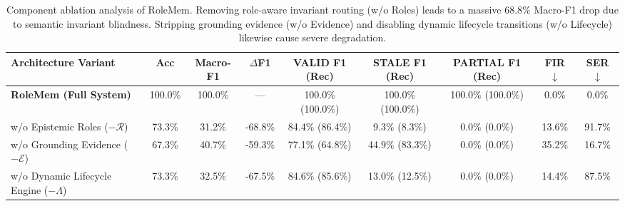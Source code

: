 \begin{table}[t]
\centering
\small
\begin{tabular}{lcccccccc}
\toprule
\textbf{Architecture Variant} & \textbf{Acc} & \textbf{Macro-F1} & $\Delta$\textbf{F1} & \textbf{VALID F1 (Rec)} & \textbf{STALE F1 (Rec)} & \textbf{PARTIAL F1 (Rec)} & \textbf{FIR} $\downarrow$ & \textbf{SER} $\downarrow$ \\
\midrule
\textbf{RoleMem (Full System)} & 100.0\% & 100.0\% & --- & 100.0\% (100.0\%) & 100.0\% (100.0\%) & 100.0\% (100.0\%) & 0.0\% & 0.0\% \\
\quad w/o Epistemic Roles ($-\mathcal{R}$) & 73.3\% & 31.2\% & -68.8\% & 84.4\% (86.4\%) & 9.3\% (8.3\%) & 0.0\% (0.0\%) & 13.6\% & 91.7\% \\
\quad w/o Grounding Evidence ($-\mathcal{E}$) & 67.3\% & 40.7\% & -59.3\% & 77.1\% (64.8\%) & 44.9\% (83.3\%) & 0.0\% (0.0\%) & 35.2\% & 16.7\% \\
\quad w/o Dynamic Lifecycle Engine ($-\Lambda$) & 73.3\% & 32.5\% & -67.5\% & 84.6\% (85.6\%) & 13.0\% (12.5\%) & 0.0\% (0.0\%) & 14.4\% & 87.5\% \\
\bottomrule
\end{tabular}
\caption{Component ablation analysis of RoleMem. Removing role-aware invariant routing (w/o Roles) leads to a massive 68.8\% Macro-F1 drop due to semantic invariant blindness. Stripping grounding evidence (w/o Evidence) and disabling dynamic lifecycle transitions (w/o Lifecycle) likewise cause severe degradation.}
\label{tab:ablation_study}
\end{table}